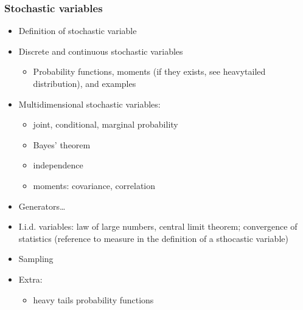 \documentclass[letterpaper,10pt,english]{jupyterBook}
\begin{document}
\subsubsection*{Stochastic variables}
\begin{itemize}
\item {} 
\sphinxAtStartPar
Definition of stochastic variable

\item {} 
\sphinxAtStartPar
Discrete and continuous stochastic variables
\begin{itemize}
\item {} 
\sphinxAtStartPar
Probability functions, moments (if they exists, see heavy\sphinxhyphen{}tailed distribution), and examples

\end{itemize}

\item {} 
\sphinxAtStartPar
Multi\sphinxhyphen{}dimensional stochastic variables:
\begin{itemize}
\item {} 
\sphinxAtStartPar
joint, conditional, marginal probability

\item {} 
\sphinxAtStartPar
Bayes’ theorem

\item {} 
\sphinxAtStartPar
independence

\item {} 
\sphinxAtStartPar
moments: covariance, correlation

\end{itemize}

\item {} 
\sphinxAtStartPar
Generators…

\item {} 
\sphinxAtStartPar
I.i.d. variables: law of large numbers, central limit theorem; convergence of statistics (reference to measure in the definition of a sthocastic variable)

\item {} 
\sphinxAtStartPar
Sampling

\item {} 
\sphinxAtStartPar
Extra:
\begin{itemize}
\item {} 
\sphinxAtStartPar
heavy tails probability functions

\end{itemize}

\end{itemize}
\end{document}
